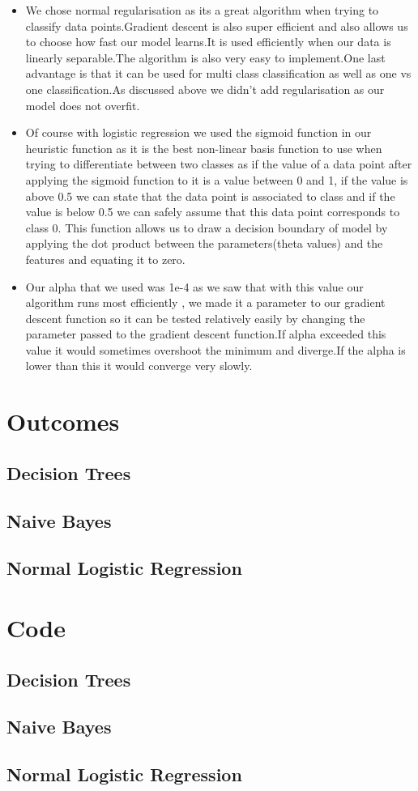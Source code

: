 \documentclass{article}
\begin{document}
\begin{itemize}
    \item We chose normal regularisation as its a great algorithm when trying to classify data points.Gradient descent is also super efficient and also allows us to choose how fast our model learns.It is used efficiently when our data is linearly separable.The algorithm is also very easy to implement.One last advantage is that it can be used for multi class classification as well as one vs one classification.As discussed above we didn't add regularisation as our model does not overfit.
    \item Of course with logistic regression we used the sigmoid function in our heuristic function as it is the best non-linear basis function to use when trying to differentiate between two classes as if the value of a data point after applying the sigmoid function to it is a value between 0 and 1, if the value is above 0.5 we can state that the data point is associated to class and if the value is below 0.5 we can safely assume that this data point corresponds to class 0. This function allows us to draw a decision boundary of model by applying the dot product between the parameters(theta values) and the features and equating it to zero.
    \item Our alpha that we used was 1e-4 as we saw that with this value our algorithm runs most efficiently , we made it a parameter to our gradient descent function so it can be tested relatively easily by changing the parameter passed to the gradient descent function.If alpha exceeded this value it would sometimes overshoot the minimum and diverge.If the alpha is lower than this it would converge very slowly.
\end{itemize}







\section{Outcomes}
\subsection{Decision Trees}
\subsection{Naive Bayes}
\subsection{Normal Logistic Regression}

\section{Code}
\subsection{Decision Trees}
\subsection{Naive Bayes}
\subsection{Normal Logistic Regression}
\end{document}

